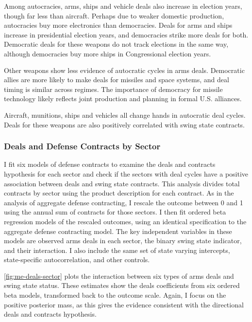 \documentclass[12pt]{article}
\begin{document}
Among autocracies, arms, ships and vehicle deals also increase in election years, though far less than aircraft. 
Perhaps due to weaker domestic production, autocracies buy more electronics than democracies. 
Deals for arms and ships increase in presidential election years, and democracies strike more deals for both.  
Democratic deals for these weapons do not track elections in the same way, although democracies buy more ships in Congressional election years. 


Other weapons show less evidence of autocratic cycles in arms deals. 
Democratic allies are more likely to make deals for missiles and space systems, and deal timing is similar across regimes. 
The importance of democracy for missile technology likely reflects joint production and planning in formal U.S. alliances. 


Aircraft, munitions, ships and vehicles all change hands in autocratic deal cycles. 
Deals for these weapons are also positively correlated with swing state contracts.  



\subsubsection{Deals and Defense Contracts by Sector}


I fit six models of defense contracts to examine the deals and contracts hypothesis for each sector and check if the sectors with deal cycles have a positive association between deals and swing state contracts. 
This analysis divides total contracts by sector using the product description for each contract. 
As in the analysis of aggregate defense contracting, I rescale the outcome between 0 and 1 using the annual sum of contracts for those sectors. 
I then fit ordered beta regression models of the rescaled outcomes, using an identical specification to the aggregate defense contracting model.
The key independent variables in these models are observed arms deals in each sector, the binary swing state indicator, and their interaction. 
I also include the same set of state varying intercepts, state-specific autocorrelation, and other controls. 


\autoref{fig:me-deals-sector} plots the interaction between six types of arms deals and swing state status.  
These estimates show the deals coefficients from six ordered beta models, transformed back to the outcome scale. 
Again, I focus on the positive posterior mass, as this gives the evidence consistent with the directional deals and contracts hypothesis.
\end{document}
